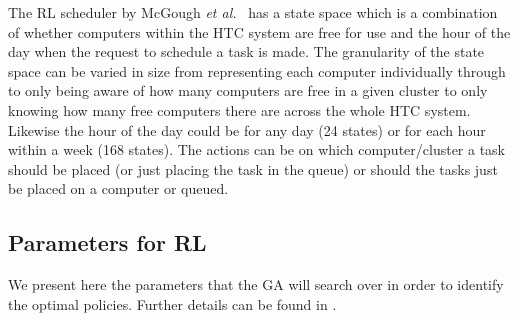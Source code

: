 \documentclass[10pt, conference, compsocconf]{IEEEtran}
\begin{document}
The RL scheduler by McGough {\em et al.}~\cite{suscom} has a state space which is a combination of whether computers within the HTC system are free for use and the hour of the day when the request to schedule a task is made. The granularity of the state space can be varied in size from representing each computer individually through to only being aware of how many computers are free in a given cluster to only knowing how many free computers there are across the whole HTC system. Likewise the hour of the day could be for any day (24 states) or for each hour within a week (168 states). The actions can be on which computer/cluster a task should be placed (or just placing the task in the queue) or should the tasks just be placed on a computer or queued.


\subsection{Parameters for RL}
We present here the parameters that the GA will search over in order to identify the optimal policies. Further details can be found in \cite{suscom}.
\end{document}
